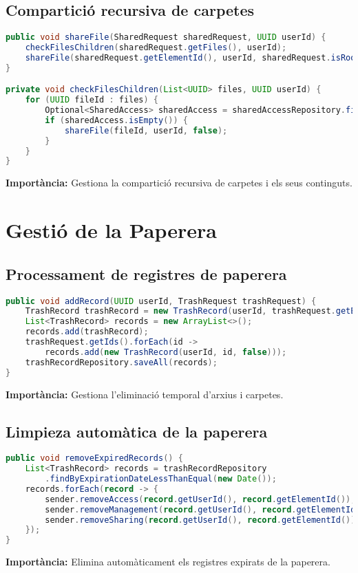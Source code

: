 \subsection{Compartició recursiva de carpetes}
\begin{lstlisting}[language=Java]
public void shareFile(SharedRequest sharedRequest, UUID userId) {
    checkFilesChildren(sharedRequest.getFiles(), userId);
    shareFile(sharedRequest.getElementId(), userId, sharedRequest.isRoot());
}

private void checkFilesChildren(List<UUID> files, UUID userId) {
    for (UUID fileId : files) {
        Optional<SharedAccess> sharedAccess = sharedAccessRepository.findById(fileId);
        if (sharedAccess.isEmpty()) {
            shareFile(fileId, userId, false);
        }
    }
}
\end{lstlisting}
\textbf{Importància:} Gestiona la compartició recursiva de carpetes i els seus continguts.

\section{Gestió de la Paperera}

\subsection{Processament de registres de paperera}
\begin{lstlisting}[language=Java]
public void addRecord(UUID userId, TrashRequest trashRequest) {
    TrashRecord trashRecord = new TrashRecord(userId, trashRequest.getElementId(), true);
    List<TrashRecord> records = new ArrayList<>();
    records.add(trashRecord);
    trashRequest.getIds().forEach(id -> 
        records.add(new TrashRecord(userId, id, false)));
    trashRecordRepository.saveAll(records);
}
\end{lstlisting}
\textbf{Importància:} Gestiona l'eliminació temporal d'arxius i carpetes.

\subsection{Limpieza automàtica de la paperera}
\begin{lstlisting}[language=Java]
public void removeExpiredRecords() {
    List<TrashRecord> records = trashRecordRepository
        .findByExpirationDateLessThanEqual(new Date());
    records.forEach(record -> {
        sender.removeAccess(record.getUserId(), record.getElementId());
        sender.removeManagement(record.getUserId(), record.getElementId());
        sender.removeSharing(record.getUserId(), record.getElementId());
    });
}
\end{lstlisting}
\textbf{Importància:} Elimina automàticament els registres expirats de la paperera.


